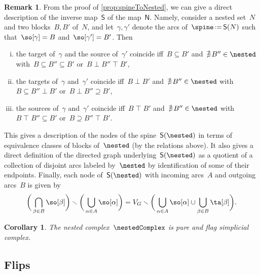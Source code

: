\documentclass{amsart}
\newtheorem{corollary}[theorem]{Corollary}
\theoremstyle{definition}
\newtheorem{remark}[theorem]{Remark}
\newcommand{\ssm}{\smallsetminus} %
\newcommand{\eqdef}{\mbox{\,\raisebox{0.2ex}{\scriptsize\ensuremath{\mathrm:}}\ensuremath{=}\,}} %
\newcommand{\negDisjoint}{\perp} %
\newcommand{\posDisjoint}{\;\top\;} %
\newcommand{\spineToNested}{\mathsf{N}} %
\newcommand{\nestedToSpine}{\mathsf{S}} %
\begin{document}
\begin{remark}
  \label{rem:nestedToSpine}
  From the proof of \cref{prop:spineToNested}, we can give a direct description of the inverse map~$\nestedToSpine$ of the map~$\spineToNested$.
  Namely, consider a nested set~$N$ and two blocks~$B, B'$ of~$N$, and let~$\gamma, \gamma'$ denote the arcs of~$\spine \eqdef \nestedToSpine(N)$ such that~$\so[\gamma] = B$ and~$\so[\gamma'] = B'$.
  Then
  \begin{enumerate}[(i)]
    \item the target of~$\gamma$ and the source of~$\gamma'$ coincide iff~$B \subseteq B'$ and~$\nexists \, B'' \in \nested$ with~$B \subseteq B'' \subseteq B'$ or~$B \negDisjoint B'' \posDisjoint B'$,
    \item the targets of~$\gamma$ and~$\gamma'$ coincide iff~$B \negDisjoint B'$ and~$\nexists \, B'' \in \nested$ with~$B \subseteq B'' \negDisjoint B'$ or~${B \negDisjoint B'' \supseteq B'}$,
\item the sources of~$\gamma$ and~$\gamma'$ coincide iff~$B \posDisjoint B'$ and~$\nexists \, B'' \in \nested$ with~$B \posDisjoint B'' \subseteq B'$ or~${B \supseteq B'' \posDisjoint B'}$.
\end{enumerate}
This gives a description of the nodes of the spine~$\nestedToSpine(\nested)$ in terms of equivalence classes of blocks of~$\nested$ (by the relations above). It also gives a direct definition of the directed graph underlying~$\nestedToSpine(\nested)$ as a quotient of a collection of disjoint arcs labeled by~$\nested$ by identification of some of their endpoints. Finally, each node of~$\nestedToSpine(\nested)$ with incoming arcs~$A$ and outgoing arcs~$B$ is given by
\[
\bigg( \bigcap_{\beta \in B} \so[\beta] \bigg) \ssm \bigg( \bigcup_{\alpha \in A} \so[\alpha] \bigg) = V_G \ssm \bigg( \bigcup_{\alpha \in A} \so[\alpha] \cup \bigcup_{\beta \in B} \ta[\beta] \bigg).
\]
\end{remark}

\begin{corollary}
  The nested complex~$\nestedComplex$ is pure and flag simplicial complex.
\end{corollary}


\subsection{Flips}
\end{document}
